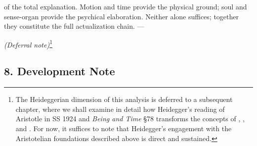 of the total explanation. Motion and time provide the physical ground; soul and sense-organ provide the psychical elaboration. Neither alone suffices; together they constitute the full actualization chain. ---

\noindent\textit{(Deferral note)}\footnote{The Heideggerian dimension of this analysis is deferred to a subsequent chapter, where we shall examine in detail how Heidegger's reading of Aristotle in SS 1924 and \textit{Being and Time} §78 transforms the concepts of , , and . For now, it suffices to note that Heidegger's engagement with the Aristotelian foundations described above is direct and sustained.}

\subsection*{8. Development Note}

